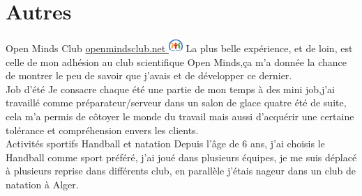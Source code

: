 \documentclass[]{friggeri-cv}
\begin{document}
\section{Autres}
\begin{entrylist}
   \entry
    { }
    {Open Minds Club}
    {\href{http://www.openmindsclub.net}{openmindsclub.net \includegraphics[width=15pt]{images/favicon.png}}}
    {La plus belle expérience, et de loin, est celle de mon adhésion au club scientifique Open Minds,ça m'a donnée la chance de montrer le peu de savoir que j'avais et de développer ce dernier.\\}
  \entry
    {}
    {Job d'été}
    {}
    {Je consacre chaque été une partie de mon temps à des mini job,j'ai travaillé comme préparateur/serveur dans un salon de glace quatre été de suite, cela m'a permis de côtoyer le monde du travail mais aussi d’acquérir une certaine tolérance et compréhension envers les clients.\\}
  \entry
    { }
    {Activités sportifs}
    {Handball et natation}
    {Depuis l'âge de 6 ans, j'ai choisis le Handball comme sport préféré, j'ai joué dans plusieurs équipes, je me suis déplacé à plusieurs reprise dans différents club, en parallèle j'étais nageur dans un club de natation à Alger.\\}
\end{entrylist}
\end{document}

